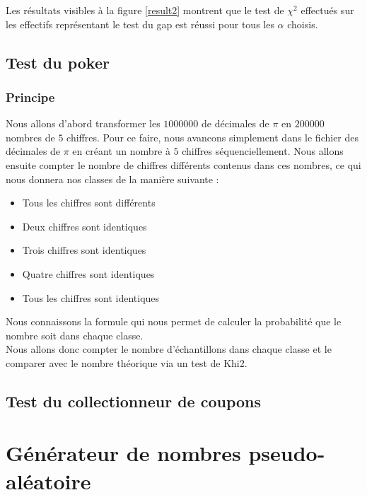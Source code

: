 \documentclass[10pt,a4paper]{article}
\begin{document}
Les résultats visibles à la figure \ref{result2} montrent que le test de $\chi^2$ effectués sur les effectifs représentant le test du gap est réussi pour tous les $\alpha$ choisis.

\subsection{Test du poker}
\subsubsection*{Principe}
Nous allons d'abord transformer les $1 000 000$ de décimales de $\pi$ en $200 000$ nombres de $5$ chiffres. Pour ce faire, nous 
avancons simplement dans le fichier des décimales de $\pi$ en créant un nombre à $5$ chiffres séquenciellement.
Nous allons ensuite compter le nombre de chiffres différents contenus dans ces nombres, ce qui nous donnera nos classes de la manière
suivante : \\
\begin{itemize}
\item Tous les chiffres sont différents
\item Deux chiffres sont identiques
\item Trois chiffres sont identiques
\item Quatre chiffres sont identiques
\item Tous les chiffres sont identiques
\end{itemize}

Nous connaissons la formule qui nous permet de calculer la probabilité que le nombre soit dans chaque classe.\\

Nous allons donc compter le nombre d'échantillons dans chaque classe et le comparer avec le nombre théorique via un test de Khi2.


\subsection{Test du collectionneur de coupons}

\section{Générateur de nombres pseudo-aléatoire}
\end{document}
